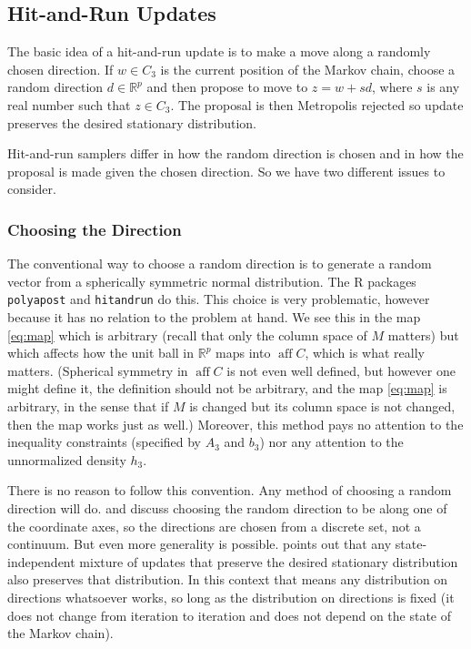 \documentclass[11pt]{article}
\DeclareMathOperator{\aff}{aff}
\newcommand{\real}{\mathbb{R}}
\begin{document}
\subsection{Hit-and-Run Updates}

The basic idea of a hit-and-run update is to make a move along a randomly
chosen direction.    If $w \in C_3$ is the current position of the Markov
chain, choose a random direction $d \in \real^p$ and then propose to move
to $z = w + s d$, where $s$ is any real number such that $z \in C_3$.
The proposal is then Metropolis rejected so update preserves the desired
stationary distribution.

Hit-and-run samplers differ in how the random direction is chosen and in
how the proposal is made given the chosen direction.  So we have two
different issues to consider.

\subsubsection{Choosing the Direction}

The conventional way to choose a random direction is to generate
a random vector from a spherically symmetric normal distribution.
The R packages \texttt{polyapost} and \texttt{hitandrun} do this.
This choice is very problematic, however because it has no relation
to the problem at hand.  We see this in the map \eqref{eq:map} which
is arbitrary (recall that only the column space of $M$ matters) but
which affects how the unit ball in $\real^p$ maps into $\aff C$,
which is what really matters.  (Spherical symmetry in $\aff C$ is not
even well defined, but however one might define it, the definition
should not be arbitrary, and the map \eqref{eq:map} is arbitrary,
in the sense that if $M$ is changed but its column space is not changed,
then the map works just as well.)
Moreover, this method pays no attention
to the inequality constraints (specified by $A_3$ and $b_3$) nor any
attention to the unnormalized density $h_3$.

There is no reason to follow this convention.  Any method of choosing
a random direction will do.  \citet{smith} and \citet{hit-run-one}
discuss choosing the random direction to be along one of the coordinate axes,
so the directions are chosen from a discrete set, not a continuum.
But even more generality is possible.
\citet[Section~1.12.8]{geyer-intro} points out
that any state-independent mixture of updates that preserve the desired
stationary distribution also preserves that distribution.  In this context
that means any distribution on directions whatsoever works, so long as the
distribution on directions is fixed (it does not change from iteration
to iteration and does not depend on the state of the Markov chain).
\end{document}
